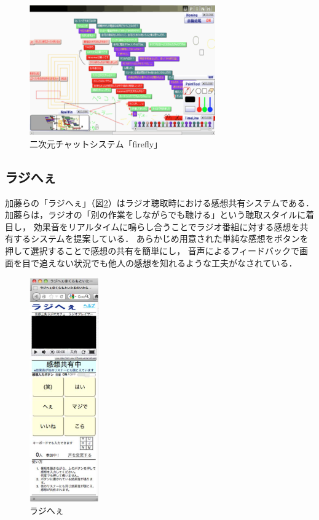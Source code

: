 \begin{figure}[H]
\centering
\includegraphics[width=8cm]{images/2dchat.png}
\caption{二次元チャットシステム「firefly」}
\label{2dchat}
\end{figure}


\subsection{ラジへぇ}

加藤らの「ラジへぇ\cite{110009657336}」（図\ref{rajihe}）はラジオ聴取時における感想共有システムである．
加藤らは，ラジオの「別の作業をしながらでも聴ける」という聴取スタイルに着目し，
効果音をリアルタイムに鳴らし合うことでラジオ番組に対する感想を共有するシステムを提案している．
あらかじめ用意された単純な感想をボタンを押して選択することで感想の共有を簡単にし，
音声によるフィードバックで画面を目で追えない状況でも他人の感想を知れるような工夫がなされている．

\begin{figure}[H]
\centering
\includegraphics[width=3cm]{images/rajihe.png}
\caption{ラジへぇ}
\label{rajihe}
\end{figure}


